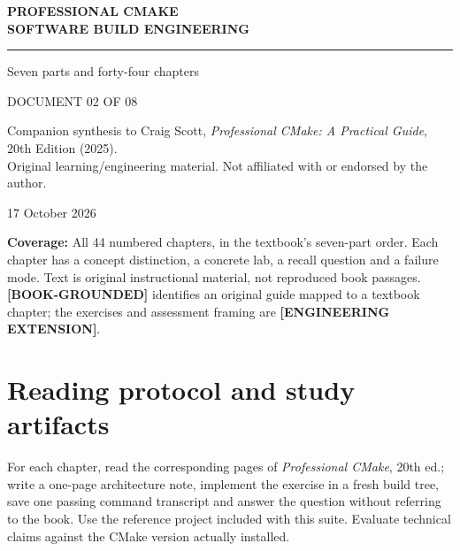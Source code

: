 \documentclass[11pt,letterpaper,oneside]{report}
\begin{document}
\hypersetup{pageanchor=false}\begin{titlepage}
\color{navy}
\vspace*{1.15in}
{\Large\bfseries PROFESSIONAL CMAKE\\[7pt]SOFTWARE BUILD ENGINEERING\par}
\vspace{0.32in}\noindent\textcolor{teal}{\rule{0.9\linewidth}{2.3pt}}\par
\vspace{0.45in}
\par
\vspace{0.3in}
{\Large\color{teal}Seven parts and forty-four chapters\par}
\vfill
{\large DOCUMENT 02 OF 08\par}
\vspace{0.1in}
{\small Companion synthesis to Craig Scott, \emph{Professional CMake: A Practical Guide}, 20th Edition (2025).\\
Original learning/engineering material. Not affiliated with or endorsed by the author.\par}
\vspace{0.2in}
{\small 17 October 2026\par}
\end{titlepage}
\hypersetup{pageanchor=true}\clearpage{}\tableofcontents\clearpage{}

\textbf{Coverage:} All 44 numbered chapters, in the textbook's
seven-part order. Each chapter has a concept distinction, a concrete
lab, a recall question and a failure mode. Text is original
instructional material, not reproduced book passages.
\textbf{{[}BOOK-GROUNDED{]}} identifies an original guide mapped to a
textbook chapter; the exercises and assessment framing are
\textbf{{[}ENGINEERING EXTENSION{]}}.

\chapter{Reading protocol and study
artifacts}\label{reading-protocol-and-study-artifacts}

For each chapter, read the corresponding pages of \emph{Professional
CMake}, 20th ed.; write a one-page architecture note, implement the
exercise in a fresh build tree, save one passing command transcript and
answer the question without referring to the book. Use the reference
project included with this suite. Evaluate technical claims against the
CMake version actually installed.
\end{document}

